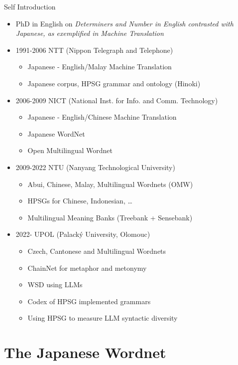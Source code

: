 \documentclass{beamer}
\begin{document}
\begin{frame}[allowframebreaks]{Self Introduction}
\begin{itemize}
\item PhD in English on  \textit{Determiners and Number in English
  contrasted with Japanese,  as exemplified in Machine
  Translation} 
\item 1991-2006 NTT (Nippon Telegraph and Telephone)
  \begin{itemize}
  \item Japanese - English/Malay Machine Translation
  \item Japanese corpus, HPSG grammar and ontology (Hinoki)
  \end{itemize}
\item 2006-2009 NICT (National Inst. for Info. and Comm. Technology)
  \begin{itemize}
  \item Japanese - English/Chinese Machine Translation
  \item Japanese WordNet
  \item Open Multilingual Wordnet
  \end{itemize}
\framebreak
\item 2009-2022 NTU (Nanyang Technological University)
  \begin{itemize}
  \item Abui, Chinese, Malay, Multilingual Wordnets (OMW)
  \item HPSGs for Chinese, Indonesian, \ldots
  \item Multilingual Meaning Banks (Treebank + Sensebank)
  \end{itemize}
\item 2022- UPOL (Palacký University, Olomouc)
  \begin{itemize}
  \item Czech, Cantonese and Multilingual Wordnets
  \item ChainNet for metaphor and metonymy
  \item WSD using LLMs
  \item Codex of HPSG implemented grammars
  \item Using HPSG to measure LLM syntactic diversity
  \end{itemize}
\end{itemize}
\end{frame}



\section{The Japanese Wordnet}
\end{document}
